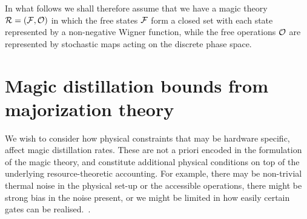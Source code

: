 \documentclass[pra,
aps,
twocolumn,
superscriptaddress,
groupedaddress,
nofootinbib,
reprint
]{revtex4-1}
\begin{document}
In what follows we shall therefore assume that we have a magic theory ${\mathcal R} = ({\mathcal F}, {\mathcal O})$ in which the free states ${\mathcal F}$ form a closed set with each state represented by a non-negative Wigner function, while the free operations ${\mathcal O}$ are represented by stochastic maps acting on the discrete phase space.


\section{Magic distillation bounds from majorization theory}
\label{sec:frag}

We wish to consider how physical constraints that may be hardware specific, affect magic distillation rates. These are not a priori encoded in the formulation of the magic theory, and constitute additional physical conditions on top of the underlying resource-theoretic accounting. For example, there may be non-trivial thermal noise in the physical set-up or the accessible operations, there might be strong bias in the noise present, or we might be limited in how easily certain gates can be realised.~\cite{Aliferis_2008, Stephens_2013, Li_2015, Babbush_2018, Tuckett_2019, Guillaud_2019, Fowler_2019}. 
\end{document}
